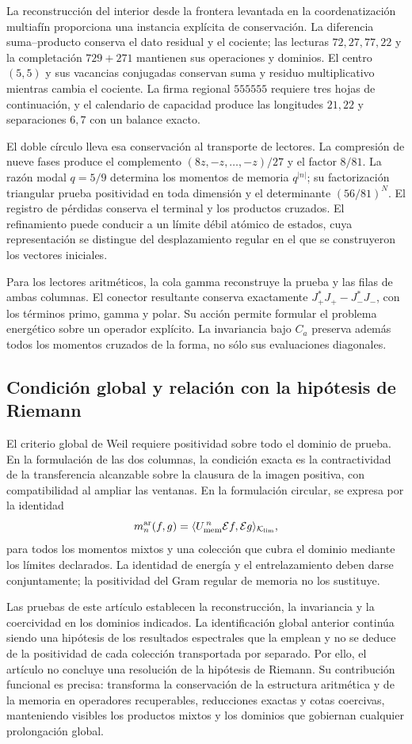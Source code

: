 La reconstrucción del interior desde la frontera levantada
en la coordenatización multiafín proporciona una instancia explícita de
conservación. La diferencia suma--producto conserva el dato
residual y el cociente; las lecturas $72,27,77,22$ y la
completación $729+271$ mantienen sus operaciones y dominios.
El centro $(5,5)$ y sus vacancias conjugadas conservan suma
y residuo multiplicativo mientras cambia el cociente. La
firma regional $555555$ requiere tres hojas de continuación,
y el calendario de capacidad produce las longitudes $21,22$
y separaciones $6,7$ con un balance exacto.

El doble círculo lleva esa conservación al transporte de
lectores. La compresión de nueve fases produce el complemento
$(8z,-z,\ldots,-z)/27$ y el factor $8/81$. La razón modal
$q=5/9$ determina los momentos de memoria $q^{|n|}$; su
factorización triangular prueba positividad en toda dimensión
y el determinante $(56/81)^N$. El registro de pérdidas
conserva el terminal y los productos cruzados. El refinamiento
puede conducir a un límite débil atómico de estados, cuya
representación se distingue del desplazamiento regular en
el que se construyeron los vectores iniciales.

Para los lectores aritméticos, la cola gamma reconstruye la
prueba y las filas de ambas columnas. El conector resultante
conserva exactamente
$J_+^*J_+-J_-^*J_-$, con los términos primo, gamma y polar.
Su acción permite formular el problema energético sobre un
operador explícito. La invariancia bajo $C_a$ preserva además
todos los momentos cruzados de la forma, no sólo sus
evaluaciones diagonales.

\subsection*{Condición global y relación con la hipótesis de Riemann}

El criterio global de Weil requiere positividad sobre todo
el dominio de prueba. En la formulación de las dos columnas,
la condición exacta es la contractividad de la transferencia
alcanzable sobre la clausura de la imagen positiva, con
compatibilidad al ampliar las ventanas. En la formulación
circular, se expresa por la identidad
\[
m_n^{\rm ar}(f,g)
=\langle U_{\rm mem}^{\,n}\mathcal E f,
          \mathcal E g\rangle_{\mathcal K_{\rm lim}},
\]
para todos los momentos mixtos y una colección que cubra el
dominio mediante los límites declarados. La identidad de
energía y el entrelazamiento deben darse conjuntamente; la
positividad del Gram regular de memoria no los sustituye.

Las pruebas de este artículo establecen la reconstrucción,
la invariancia y la coercividad en los dominios indicados.
La identificación global anterior continúa siendo una
hipótesis de los resultados espectrales que la emplean y no
se deduce de la positividad de cada colección transportada por
separado. Por ello, el artículo no concluye una resolución
de la hipótesis de Riemann. Su contribución funcional es
precisa: transforma la conservación de la estructura
aritmética y de la memoria en operadores recuperables,
reducciones exactas y cotas coercivas, manteniendo visibles
los productos mixtos y los dominios que gobiernan cualquier
prolongación global.
